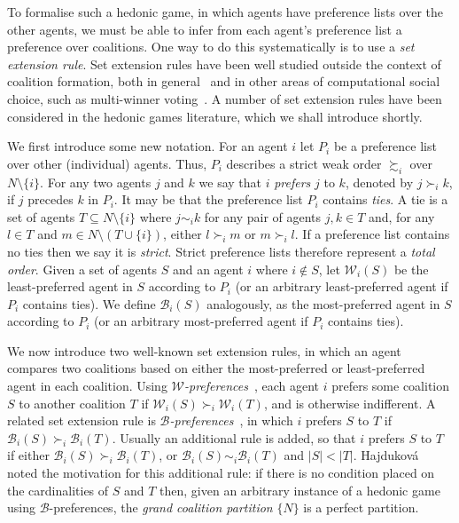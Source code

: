 To formalise such a hedonic game, in which agents have preference lists over the other agents, we must be able to infer from each agent's preference list a preference over coalitions. One way to do this systematically is to use a \emph{set extension rule}. Set extension rules have been well studied outside the context of coalition formation, both in general~\cite{BBP04} and in other areas of computational social choice, such as multi-winner voting~\cite{AzizLang2016}. A number of set extension rules have been considered in the hedonic games literature, which we shall introduce shortly.

We first introduce some new notation. For an agent $i$ let $P_i$ be a preference list over other (individual) agents. Thus, $P_i$ describes a strict weak order $\succsim_i$ over $N\setminus \{ i \}$. For any two agents $j$ and $k$ we say that $i$ \textit{prefers} $j$ to $k$, denoted by $j \succ_i k$, if $j$ precedes $k$ in $P_{i}$. It may be that the preference list $P_i$ contains \emph{ties}. A tie is a set of agents $T \subseteq N \setminus \{ i \}$ where $j \sim_i k$ for any pair of agents $j, k \in T$ and, for any $l \in T$ and $m \in N \setminus (T \cup \{ i \})$, either $l \succ_i m$ or $m \succ_i l$. If a preference list contains no ties then we say it is \emph{strict}. Strict preference lists therefore represent a \emph{total order}. Given a set of agents $S$ and an agent $i$ where $i \notin S$, let $\mathscr{W}_i(S)$ be the least-preferred agent in $S$ according to $P_i$ (or an arbitrary least-preferred agent if $P_i$ contains ties). We define $\mathscr{B}_i(S)$ analogously, as the most-preferred agent in $S$ according to $P_i$ (or an arbitrary most-preferred agent if $P_i$ contains ties).

We now introduce two well-known set extension rules, in which an agent compares two coalitions based on either the most-preferred or least-preferred agent in each coalition. Using \emph{$\mathscr{W}$-preferences}~\cite{CH04}, each agent $i$ prefers some coalition $S$ to another coalition $T$ if $\mathscr{W}_i(S) \succ_i \mathscr{W}_i(T)$, and is otherwise indifferent. A related set extension rule is \emph{$\mathscr{B}$-preferences}~\cite{CR01}, in which $i$ prefers $S$ to $T$ if $\mathscr{B}_i(S) \succ_i \mathscr{B}_i(T)$. Usually an additional rule is added, so that $i$ prefers $S$ to $T$ if either $\mathscr{B}_i(S) \succ_i \mathscr{B}_i(T)$, or $\mathscr{B}_i(S) \sim_i \mathscr{B}_i(T)$ and $|S| < |T|$. Hajdukov\'a~\cite{Haj06} noted the motivation for this additional rule: if there is no condition placed on the cardinalities of $S$ and $T$ then, given an arbitrary instance of a hedonic game using $\mathscr{B}$-preferences, the \emph{grand coalition partition} $\{ N \}$ is a perfect partition.


